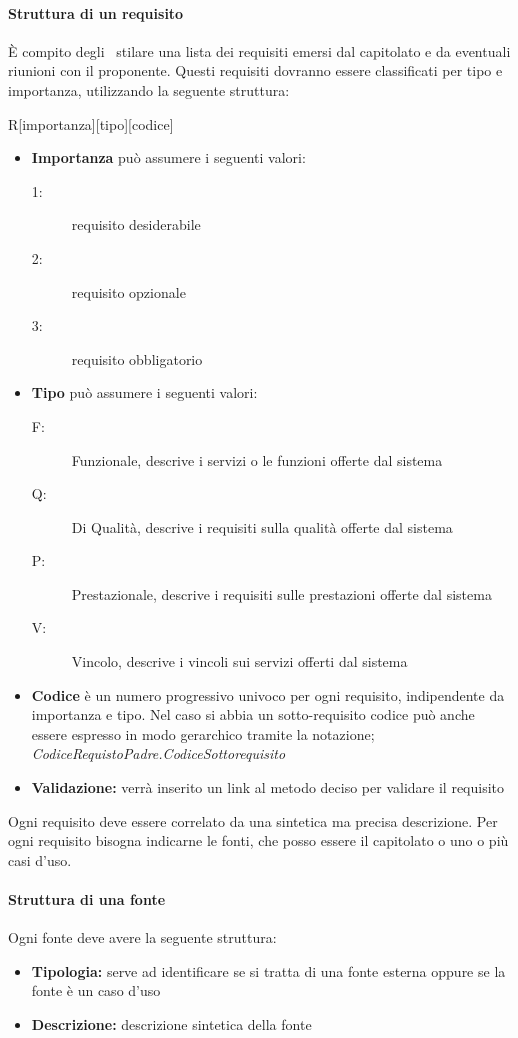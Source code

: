 \documentclass[12pt,a4paper]{article}
\begin{document}
\paragraph{Struttura di un requisito}
È compito degli \ANpl\ stilare una lista dei requisiti emersi dal capitolato e da eventuali riunioni con il proponente. Questi requisiti dovranno essere classificati per tipo e importanza, utilizzando la seguente struttura:
\begin{center}
	R[importanza][tipo][codice]
\end{center}
\begin{itemize}
	\item \textbf{Importanza} può assumere i seguenti valori:
	\begin{description}
		\item[1:] requisito desiderabile
		\item[2:] requisito opzionale
		\item[3:] requisito obbligatorio
	\end{description}
	\item \textbf{Tipo} può assumere i seguenti valori:
	\begin{description}
		\item[F:] Funzionale, descrive i servizi o le funzioni offerte dal sistema
		\item[Q:] Di Qualità, descrive i requisiti sulla qualità offerte dal sistema
		\item[P:] Prestazionale, descrive i requisiti sulle prestazioni offerte dal sistema
		\item[V:] Vincolo, descrive i vincoli sui servizi offerti dal sistema
	\end{description}
	\item \textbf{Codice} è un numero progressivo univoco per ogni requisito, indipendente da importanza e tipo. Nel caso si abbia un sotto-requisito codice può anche essere espresso in modo gerarchico tramite la notazione; \textit{CodiceRequistoPadre.CodiceSottorequisito}
	\item \textbf{Validazione:} verrà inserito un link al metodo deciso per validare il requisito
\end{itemize}
Ogni requisito deve essere correlato da una sintetica ma precisa descrizione. Per ogni requisito bisogna indicarne le fonti, che posso essere il capitolato o uno o più casi d'uso.

\paragraph{Struttura di una fonte}
Ogni fonte deve avere la seguente struttura:
\begin{itemize}
	\item \textbf{Tipologia:} serve ad identificare se si tratta di una fonte esterna oppure se la fonte è un caso d'uso
	\item \textbf{Descrizione:} descrizione sintetica della fonte
\end{itemize}
\end{document}
